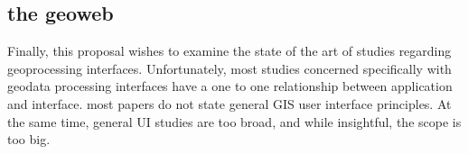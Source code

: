 






\subsection{the geoweb}

Finally, this proposal wishes to examine the state of the art of studies regarding geoprocessing interfaces. Unfortunately, most studies concerned specifically with geodata processing interfaces have a one to one relationship between application and interface. most papers do not state general GIS user interface principles. At the same time, general UI studies are too broad, and while insightful, the scope is too big. 

